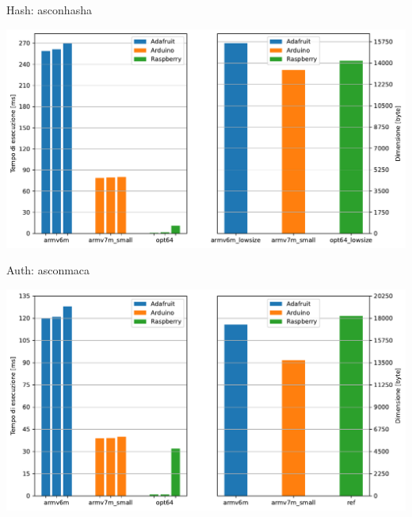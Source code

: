 \begin{frame}{Hash: asconhasha}

    \begin{center}
        \includegraphics[height=0.40\textwidth]{images/analysis/hash.pdf}
    \end{center}
    
\end{frame}


\begin{frame}{Auth: asconmaca}

    \begin{center}
        \includegraphics[height=0.40\textwidth]{images/analysis/auth.pdf}
    \end{center}
    
\end{frame}


